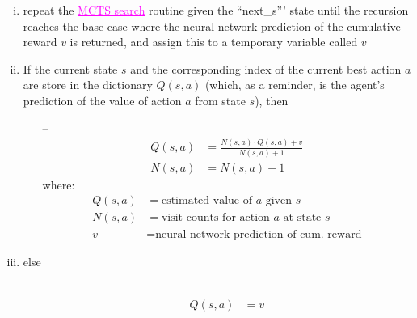 \documentclass[12pt]{article}
\begin{document}
\begin{redenum}
\begin{enumerate}[A.)]
\begin{enumerate}[I.)]
\begin{enumerate}[i.)]
\begin{enumerate}[a.)]
\begin{goldenum}
\begin{enumerate}[a.)]
\begin{redenumnest}
\begin{enumerate}[a.)]
\begin{magentaenum}
\begin{enumerate}[a.)]
\begin{enumerate}[i.)]
											\item repeat the \textcolor{magenta}{\underline{MCTS search}} routine given the ``next\_s''' state until the recursion reaches the base case where the neural network prediction of the cumulative reward $v$ is returned, and assign this to a temporary variable called $v$
											\item If the current state $s$ and the corresponding index of the current best action $a$ are store in the dictionary $Q(s,a)$ (which, as a reminder, is the agent's prediction of the value of action $a$ from state $s$), then
											\begin{itemize}
												\item[--] 
												\begin{align*}
													Q(s,a) &= \frac{N(s,a) \cdot Q(s,a) + v}{N(s,a) + 1} \\
													N(s,a) &= N(s,a) + 1
												\end{align*}
												where:
												\begin{align*}
													Q(s,a) &= \text{estimated value of $a$ given $s$} \\
													N(s,a) &= \text{visit counts for action $a$ at state $s$} \\
													v &= \text{neural network prediction of cum. reward}
												\end{align*}
											\end{itemize}
											\item else
											\begin{itemize}
												\item[--] 
												\begin{align*}
													Q(s,a) &= v \\

\end{align*}
\end{itemize}
\end{enumerate}
\end{enumerate}
\end{magentaenum}
\end{enumerate}
\end{redenumnest}
\end{enumerate}
\end{goldenum}
\end{enumerate}
\end{enumerate}
\end{enumerate}
\end{enumerate}
\end{redenum}
\end{document}
